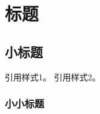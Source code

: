 
\chapter{标题}

\section{小标题}
引用样式1\cite{example2025}。
引用样式2\parencite{example2025}。
\subsection{小小标题}

